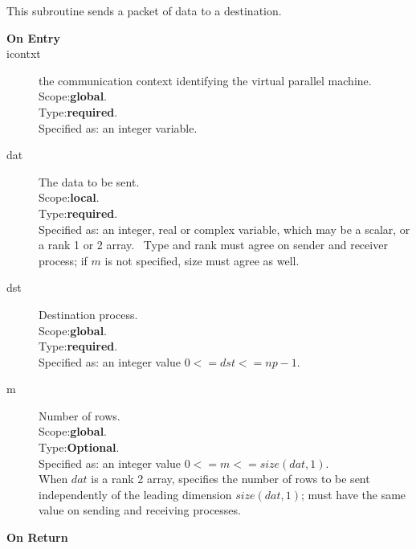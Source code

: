 This subroutine sends a packet of data to a destination.
\begin{description}
\item[\bf  On Entry ]
\item[icontxt] the communication context identifying the virtual
  parallel machine.\\
Scope:{\bf global}.\\
Type:{\bf required}.\\
Specified as: an integer variable.
\item[dat] The data to be sent.\\
Scope:{\bf local}.\\
Type:{\bf required}.\\
Specified as: an integer, real or complex variable, which may be a
scalar, or a rank 1 or 2 array. \
Type and  rank must agree on sender and receiver process; if $m$ is
not specified, size must agree as well. 
\item[dst] Destination process.\\
Scope:{\bf global}.\\
Type:{\bf required}.\\
Specified as: an integer value $0<= dst <= np-1$. \\
\item[m] Number of rows.\\
Scope:{\bf global}.\\
Type:{\bf Optional}.\\
Specified as: an integer value $0<= m <= size(dat,1)$. \\
When $dat$ is a rank 2 array, specifies the number of rows to be sent
independently of the leading dimension $size(dat,1)$; must have the
same value on sending and receiving processes.
\end{description}


\begin{description}
\item[\bf On Return]
\end{description}



